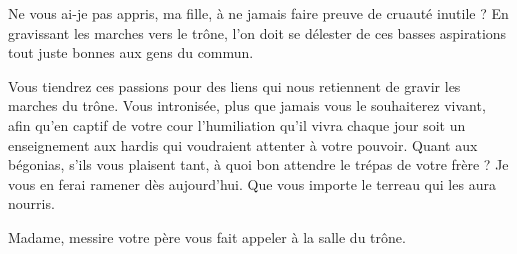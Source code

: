 \begin{drama}
  \reinespeaks Ne vous ai-je pas appris, ma fille, à ne jamais faire preuve de cruauté inutile ? En gravissant les marches vers le trône, l’on doit se délester de ces basses aspirations tout juste bonnes aux gens du commun.

  Vous tiendrez ces passions pour des liens qui nous retiennent de gravir les marches du trône.%
  Vous intronisée, plus que jamais vous le souhaiterez vivant, afin qu’en captif de votre cour l’humiliation qu’il vivra chaque jour soit un enseignement aux hardis qui voudraient attenter à votre pouvoir. Quant aux bégonias, s’ils vous plaisent tant, à quoi bon attendre le trépas de votre frère ? Je vous en ferai ramener dès aujourd’hui. Que vous importe le terreau qui les aura nourris.

  \suivanteprincessespeaks Madame, messire votre père vous fait appeler à la salle du trône.
%
%
%
\end{drama}

\scene

\StageDirII{\roi, \reine, \princesse, \elena, \alexas, \general}


